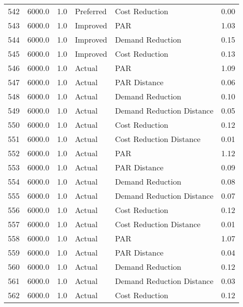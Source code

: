 \begin{longtable}{lrrllr}
542  &       6000.0 &     1.0 &      Preferred &             Cost Reduction &   0.00 \\
543  &       6000.0 &     1.0 &       Improved &                        PAR &   1.03 \\
544  &       6000.0 &     1.0 &       Improved &           Demand Reduction &   0.15 \\
545  &       6000.0 &     1.0 &       Improved &             Cost Reduction &   0.13 \\
546  &       6000.0 &     1.0 &         Actual &                        PAR &   1.09 \\
547  &       6000.0 &     1.0 &         Actual &               PAR Distance &   0.06 \\
548  &       6000.0 &     1.0 &         Actual &           Demand Reduction &   0.10 \\
549  &       6000.0 &     1.0 &         Actual &  Demand Reduction Distance &   0.05 \\
550  &       6000.0 &     1.0 &         Actual &             Cost Reduction &   0.12 \\
551  &       6000.0 &     1.0 &         Actual &    Cost Reduction Distance &   0.01 \\
552  &       6000.0 &     1.0 &         Actual &                        PAR &   1.12 \\
553  &       6000.0 &     1.0 &         Actual &               PAR Distance &   0.09 \\
554  &       6000.0 &     1.0 &         Actual &           Demand Reduction &   0.08 \\
555  &       6000.0 &     1.0 &         Actual &  Demand Reduction Distance &   0.07 \\
556  &       6000.0 &     1.0 &         Actual &             Cost Reduction &   0.12 \\
557  &       6000.0 &     1.0 &         Actual &    Cost Reduction Distance &   0.01 \\
558  &       6000.0 &     1.0 &         Actual &                        PAR &   1.07 \\
559  &       6000.0 &     1.0 &         Actual &               PAR Distance &   0.04 \\
560  &       6000.0 &     1.0 &         Actual &           Demand Reduction &   0.12 \\
561  &       6000.0 &     1.0 &         Actual &  Demand Reduction Distance &   0.03 \\
562  &       6000.0 &     1.0 &         Actual &             Cost Reduction &   0.12 \\

\end{longtable}
